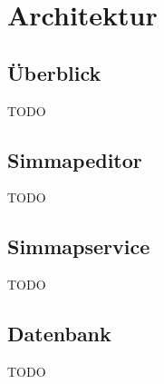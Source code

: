 \chapter{Architektur}
\section{Überblick}
\begin{flushleft}
TODO
\end{flushleft}
\section{Simmapeditor}
\begin{flushleft}
TODO
\end{flushleft}
\section{Simmapservice}
\begin{flushleft}
TODO
\end{flushleft}
\section{Datenbank}
\begin{flushleft}
TODO
\end{flushleft}